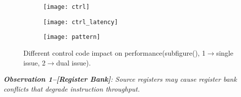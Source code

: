 \begin{figure*}
    \begin{subfigure}[htbp]{0.3\textwidth}
        \texttt{[image: ctrl]}
        \subcaption{}
        \label{fig:control_throughput}
    \end{subfigure}
    \begin{subfigure}[htbp]{0.3\textwidth}
        \texttt{[image: ctrl\_latency]}
        \subcaption{}
        \label{fig:control_latency}
    \end{subfigure}
    \begin{subfigure}[htbp]{0.3\textwidth}
        \texttt{[image: pattern]}
        \subcaption{}
        \label{fig:control_pattern}
    \end{subfigure}
    \caption{Different control code impact on performance(subfigure(), 1$\rightarrow$single
    issue, 2$\rightarrow$dual issue).}
    \label{fig:control_code}
\end{figure*}


{\em {\bf Observation 1--[Register Bank]}:
Source registers may cause register bank conflicts that degrade instruction throughput.}

